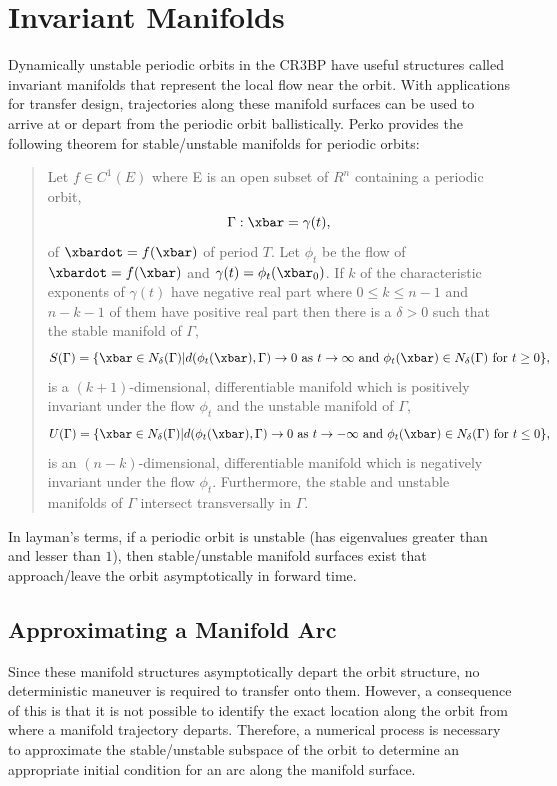 \section{Invariant Manifolds}
Dynamically unstable periodic orbits in the CR3BP have useful structures called invariant manifolds
that represent the local flow near the orbit. With applications for transfer design, trajectories
along these manifold surfaces can be used to arrive at or depart from the periodic orbit
ballistically. Perko provides the following theorem for stable/unstable manifolds for periodic
orbits\cite{Perko:1991}:
\begin{quote}
    Let $f\in C^{1}(E)$ where E is an open subset of $R^{n}$ containing a periodic orbit,
    \begin{equation}
        \Gamma:\xbar=\gamma(t),
    \end{equation}
    of $\xbardot=f(\xbar)$ of period $T$. Let $\phi_{t}$ be the flow of $\xbardot=f(\xbar)$ and
    $\gamma(t)=\phi_{t}(\xbar_{0})$. If $k$ of the characteristic exponents of $\gamma(t)$ have
    negative real part where $0\leq k\leq n-1$ and $n-k-1$ of them have positive real part then
    there is a $\delta>0$ such that the stable manifold of $\Gamma$,
    \begin{equation}
        S(\Gamma)=\{\xbar\in N_{\delta}(\Gamma)|d(\phi_{t}(\xbar),\Gamma)\rightarrow0\text{ as }t\rightarrow\infty\text{ and }\phi_{t}(\xbar)\in N_{\delta}(\Gamma)\text{ for }t\geq0\},
    \end{equation}
    is a $(k+1)$-dimensional, differentiable manifold which is positively invariant under the flow
    $\phi_{t}$ and the unstable manifold of $\Gamma$,
    \begin{equation}
        U(\Gamma)=\{\xbar\in N_{\delta}(\Gamma)|d(\phi_{t}(\xbar),\Gamma)\rightarrow0\text{ as }t\rightarrow-\infty\text{ and }\phi_{t}(\xbar)\in N_{\delta}(\Gamma)\text{ for }t\leq0\},
    \end{equation}
    is an $(n-k)$-dimensional, differentiable manifold which is negatively invariant under the flow
    $\phi_{t}$. Furthermore, the stable and unstable manifolds of $\Gamma$ intersect transversally
    in $\Gamma$.
\end{quote}
In layman's terms, if a periodic orbit is unstable (has eigenvalues greater than and lesser than
$1$), then stable/unstable manifold surfaces exist that approach/leave the orbit asymptotically in
forward time.

\subsection{Approximating a Manifold Arc}
Since these manifold structures asymptotically depart the orbit structure, no deterministic
maneuver is required to transfer onto them. However, a consequence of this is that it is not
possible to identify the exact location along the orbit from where a manifold trajectory departs.
Therefore, a numerical process is necessary to approximate the stable/unstable subspace of the
orbit to determine an appropriate initial condition for an arc along the manifold surface.

